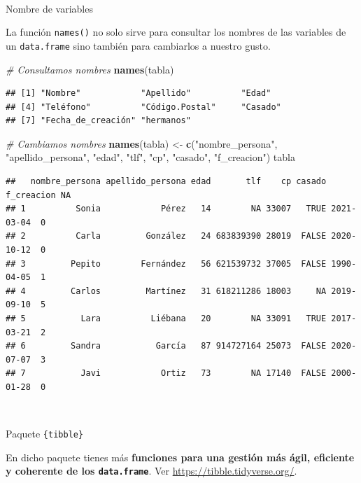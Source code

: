 \documentclass[11pt,]{book}
\newenvironment{Shaded}{\begin{snugshade}}{\end{snugshade}}
\newcommand{\CommentTok}[1]{\textcolor[rgb]{0.37,0.37,0.37}{\textit{#1}}}
\newcommand{\KeywordTok}[1]{\textcolor[rgb]{0.27,0.27,0.27}{\textbf{#1}}}
\newcommand{\NormalTok}[1]{#1}
\newcommand{\StringTok}[1]{\textcolor[rgb]{0.5,0.5,0.5}{#1}}
\begin{document}
~

Nombre de variables

La función \texttt{names()} no solo sirve para consultar los nombres de las variables de un \texttt{data.frame} sino también para cambiarlos a nuestro gusto.

\begin{Shaded}
\begin{Highlighting}[]
\CommentTok{# Consultamos nombres}
\KeywordTok{names}\NormalTok{(tabla)}
\end{Highlighting}
\end{Shaded}

\begin{verbatim}
## [1] "Nombre"            "Apellido"          "Edad"             
## [4] "Teléfono"          "Código.Postal"     "Casado"           
## [7] "Fecha_de_creación" "hermanos"
\end{verbatim}

\begin{Shaded}
\begin{Highlighting}[]
\CommentTok{# Cambiamos nombres}
\KeywordTok{names}\NormalTok{(tabla) <-}\StringTok{ }\KeywordTok{c}\NormalTok{(}\StringTok{"nombre_persona"}\NormalTok{, }\StringTok{"apellido_persona"}\NormalTok{, }\StringTok{"edad"}\NormalTok{, }\StringTok{"tlf"}\NormalTok{,}
                  \StringTok{"cp"}\NormalTok{, }\StringTok{"casado"}\NormalTok{, }\StringTok{"f_creacion"}\NormalTok{)}
\NormalTok{tabla}
\end{Highlighting}
\end{Shaded}

\begin{verbatim}
##   nombre_persona apellido_persona edad       tlf    cp casado f_creacion NA
## 1          Sonia            Pérez   14        NA 33007   TRUE 2021-03-04  0
## 2          Carla         González   24 683839390 28019  FALSE 2020-10-12  0
## 3         Pepito        Fernández   56 621539732 37005  FALSE 1990-04-05  1
## 4         Carlos         Martínez   31 618211286 18003     NA 2019-09-10  5
## 5           Lara          Liébana   20        NA 33091   TRUE 2017-03-21  2
## 6         Sandra           García   87 914727164 25073  FALSE 2020-07-07  3
## 7           Javi            Ortiz   73        NA 17140  FALSE 2000-01-28  0
\end{verbatim}

~

Paquete \texttt{\{tibble\}}

En dicho paquete tienes más \textbf{funciones para una gestión más ágil, eficiente y coherente de los \texttt{data.frame}}. Ver \url{https://tibble.tidyverse.org/}.
\end{document}
